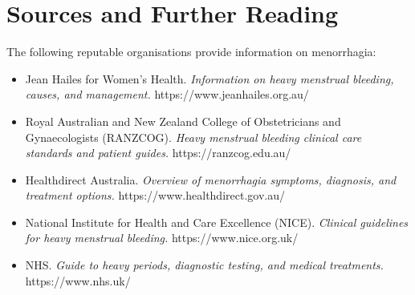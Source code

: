 \section*{Sources and Further Reading}
The following reputable organisations provide information on menorrhagia:
\begin{itemize}
    \item Jean Hailes for Women's Health. \textit{Information on heavy menstrual bleeding, causes, and management.} https://www.jeanhailes.org.au/
    \item Royal Australian and New Zealand College of Obstetricians and Gynaecologists (RANZCOG). \textit{Heavy menstrual bleeding clinical care standards and patient guides.} https://ranzcog.edu.au/
    \item Healthdirect Australia. \textit{Overview of menorrhagia symptoms, diagnosis, and treatment options.} https://www.healthdirect.gov.au/
    \item National Institute for Health and Care Excellence (NICE). \textit{Clinical guidelines for heavy menstrual bleeding.} https://www.nice.org.uk/
    \item NHS. \textit{Guide to heavy periods, diagnostic testing, and medical treatments.} https://www.nhs.uk/
\end{itemize}
